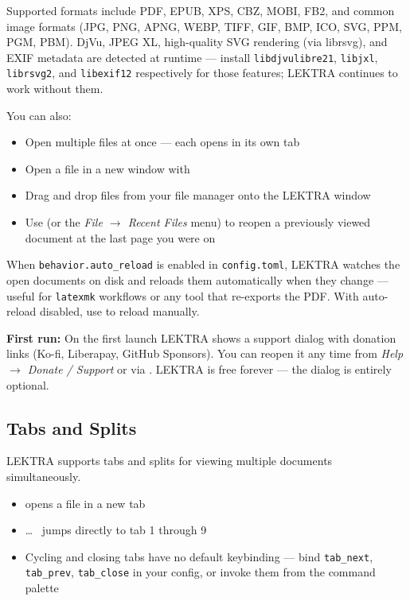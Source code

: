 \documentclass[a4paper,12pt]{article}
\begin{document}
Supported formats include PDF, EPUB, XPS, CBZ, MOBI, FB2, and common image formats (JPG, PNG, APNG, WEBP, TIFF, GIF, BMP, ICO, SVG, PPM, PGM, PBM). DjVu, JPEG XL, high-quality SVG rendering (via librsvg), and EXIF metadata are detected at runtime — install \texttt{libdjvulibre21}, \texttt{libjxl}, \texttt{librsvg2}, and \texttt{libexif12} respectively for those features; LEKTRA continues to work without them.

You can also:
\begin{itemize}[leftmargin=*]
    \item Open multiple files at once — each opens in its own tab
    \item Open a file in a new window with 
    \item Drag and drop files from your file manager onto the LEKTRA window
    \item Use  (or the \textit{File $\to$ Recent Files} menu) to reopen a previously viewed document at the last page you were on
\end{itemize}

When \texttt{behavior.auto\_\allowbreak{}reload} is enabled in \texttt{config.\allowbreak{}toml}, LEKTRA watches the open documents on disk and reloads them automatically when they change — useful for \texttt{latexmk} workflows or any tool that re-exports the PDF. With auto-reload disabled, use  to reload manually.

\begin{ghnote}
    \textbf{First run:} On the first launch LEKTRA shows a support dialog with donation links (Ko-fi, Liberapay, GitHub Sponsors). You can reopen it any time from \textit{Help $\to$ Donate / Support} or via . LEKTRA is free forever — the dialog is entirely optional.
\end{ghnote}

\subsection{Tabs and Splits}

LEKTRA supports tabs and splits for viewing multiple documents simultaneously.

\begin{itemize}[leftmargin=*]
    \item {} opens a file in a new tab
    \item {} \ldots\  jumps directly to tab 1 through 9
    \item Cycling and closing tabs have no default keybinding — bind \texttt{tab\_\allowbreak{}next}, \texttt{tab\_\allowbreak{}prev}, \texttt{tab\_\allowbreak{}close} in your config, or invoke them from the \keys{:} command palette
\end{itemize}
\end{document}
